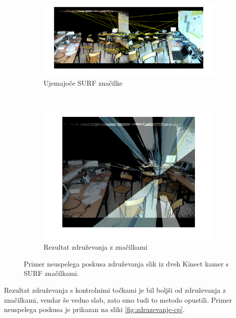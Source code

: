 \begin{figure}[!htb]
	\centering
	\begin{subfigure}[t]{0.45\columnwidth}
		\includegraphics[width=\columnwidth]{./Slike/matched-features.png}
		\caption{Ujemajoče SURF značilke}
		\label{fig:zdruzevanje-surf}
	\end{subfigure}
	~
	\begin{subfigure}[t]{0.45\columnwidth}
		\includegraphics[width=\columnwidth]{./Slike/features-calibration-result.png}
		\caption{Rezultat združevanja z značilkami}
		\label{fig:zdruzevanje-result}
	\end{subfigure}
	\caption{Primer neuspelega poskusa združevanja slik iz dveh Kinect kamer s SURF značilkami.}
	\label{fig:zdruzevanje-znacilke}
\end{figure}

 Rezultat združevanja s kontrolnimi točkami je bil boljši od združevanja z značilkami, vendar še vedno slab, zato smo tudi to metodo opustili. Primer neuspelega poskusa je prikazan na sliki \ref{fig:zdruzevanje-cp}.
 
